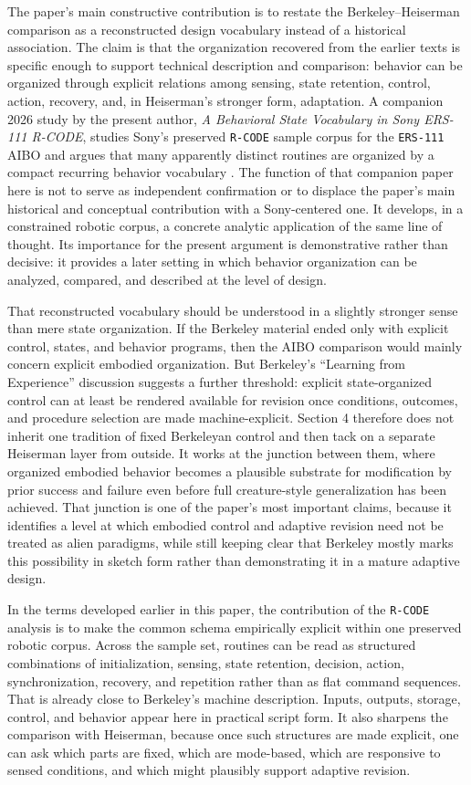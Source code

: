 \documentclass[11pt]{article}
\begin{document}
The paper's main constructive contribution is to restate the Berkeley--Heiserman comparison as a reconstructed design vocabulary instead of a historical association. The claim is that the organization recovered from the earlier texts is specific enough to support technical description and comparison: behavior can be organized through explicit relations among sensing, state retention, control, action, recovery, and, in Heiserman's stronger form, adaptation. A companion 2026 study by the present author, \emph{A Behavioral State Vocabulary in Sony ERS-111 R-CODE}, studies Sony's preserved \texttt{R-CODE} sample corpus for the \texttt{ERS-111} AIBO and argues that many apparently distinct routines are organized by a compact recurring behavior vocabulary \citep{tucker2026behavioral}. The function of that companion paper here is not to serve as independent confirmation or to displace the paper's main historical and conceptual contribution with a Sony-centered one. It develops, in a constrained robotic corpus, a concrete analytic application of the same line of thought. Its importance for the present argument is demonstrative rather than decisive: it provides a later setting in which behavior organization can be analyzed, compared, and described at the level of design.

That reconstructed vocabulary should be understood in a slightly stronger sense than mere state organization. If the Berkeley material ended only with explicit control, states, and behavior programs, then the AIBO comparison would mainly concern explicit embodied organization. But Berkeley's ``Learning from Experience'' discussion suggests a further threshold: explicit state-organized control can at least be rendered available for revision once conditions, outcomes, and procedure selection are made machine-explicit. Section 4 therefore does not inherit one tradition of fixed Berkeleyan control and then tack on a separate Heiserman layer from outside. It works at the junction between them, where organized embodied behavior becomes a plausible substrate for modification by prior success and failure even before full creature-style generalization has been achieved. That junction is one of the paper's most important claims, because it identifies a level at which embodied control and adaptive revision need not be treated as alien paradigms, while still keeping clear that Berkeley mostly marks this possibility in sketch form rather than demonstrating it in a mature adaptive design.

In the terms developed earlier in this paper, the contribution of the \texttt{R-CODE} analysis is to make the common schema empirically explicit within one preserved robotic corpus. Across the sample set, routines can be read as structured combinations of initialization, sensing, state retention, decision, action, synchronization, recovery, and repetition rather than as flat command sequences. That is already close to Berkeley's machine description. Inputs, outputs, storage, control, and behavior appear here in practical script form. It also sharpens the comparison with Heiserman, because once such structures are made explicit, one can ask which parts are fixed, which are mode-based, which are responsive to sensed conditions, and which might plausibly support adaptive revision.
\end{document}
